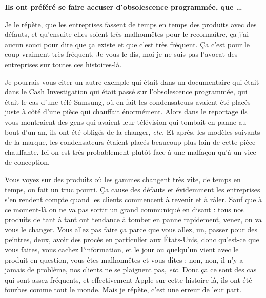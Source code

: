 \begin{small}
\textbf{Ils ont préféré se faire accuser d'obsolescence programmée, que \dots}
\smallbreak


Je le répète, que les entreprises fassent de temps en temps des produits avec des défauts, et qu'ensuite elles soient très malhonnêtes pour le reconnaître, ça j'ai aucun souci pour dire que ça existe et que c'est très fréquent. Ça c'est pour le coup vraiment très fréquent. Je vous le dis, moi je ne suis pas l'avocat des entreprises sur toutes ces histoires-là.

Je pourrais vous citer un autre exemple qui était dans un documentaire qui était dans le Cash Investigation qui était passé sur l'obsolescence programmée, qui était le cas d'une télé Samsung, où en fait les condensateurs avaient été placés juste à côté d'une pièce qui chauffait énormément. Alors dans le reportage ils vous montraient des gens qui avaient leur télévision qui tombait en panne au bout d'un an, ils ont été obligés de la changer, \textit{etc.} Et après, les modèles suivants de la marque, les condensateurs étaient placés beaucoup plus loin de cette pièce chauffante. Ici on est très probablement plutôt face à une malfaçon qu'à un vice de conception. 

Vous voyez sur des produits où les gammes changent très vite, de temps en temps, on fait un truc pourri. Ça cause des défauts et évidemment les entreprises s'en rendent compte quand les clients commencent à revenir et à râler. Sauf que à ce moment-là on ne va pas sortir un grand communiqué en disant : tous nos produits de tant à tant ont tendance à tomber en panne rapidement, venez, on va vous le changer. Vous allez pas faire ça parce que vous allez, un, passer pour des \og peintres\fg{}, deux, avoir des procès en particulier aux États-Unis, donc qu'est-ce que vous faites, vous cachez l'information, et le jour ou quelqu'un vient avec le produit en question, vous êtes malhonnêtes et vous dîtes : non, non, il n'y a jamais de problème, nos clients ne se plaignent pas, \textit{etc.} Donc ça ce sont des cas qui sont assez fréquents, et effectivement Apple sur cette histoire-là, ils ont été fourbes comme tout le monde. Mais je répète, c'est une erreur de leur part. 


\end{small}
